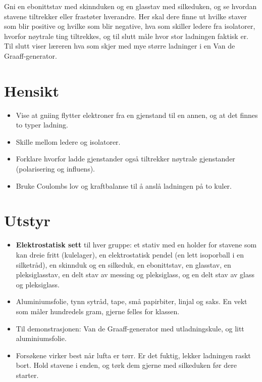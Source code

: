 \documentclass[11pt]{article}
\begin{document}

Gni en ebonittstav med skinnduken og en glasstav med silkeduken, og se hvordan stavene tiltrekker eller frastøter hverandre. Her skal dere finne ut hvilke staver som blir positive og hvilke som blir negative, hva som skiller ledere fra isolatorer, hvorfor nøytrale ting tiltrekkes, og til slutt måle hvor stor ladningen faktisk er. Til slutt viser læreren hva som skjer med mye større ladninger i en Van de Graaff-generator.

\section*{Hensikt}

\begin{itemize}
\item Vise at gniing flytter elektroner fra en gjenstand til en annen, og at det finnes to typer ladning.
\item Skille mellom ledere og isolatorer.
\item Forklare hvorfor ladde gjenstander også tiltrekker nøytrale gjenstander (polarisering og influens).
\item Bruke Coulombs lov og kraftbalanse til å anslå ladningen på to kuler.
\end{itemize}

\section*{Utstyr}

\begin{itemize}
\item \textbf{Elektrostatisk sett} til hver gruppe: et stativ med en holder for stavene som kan dreie fritt (kulelager), en elektrostatisk pendel (en lett isoporball i en silketråd), en skinnduk og en silkeduk, en ebonittstav, en glasstav, en pleksiglasstav, en delt stav av messing og pleksiglass, og en delt stav av glass og pleksiglass.
\item Aluminiumsfolie, tynn sytråd, tape, små papirbiter, linjal og saks. En vekt som måler hundredels gram, gjerne felles for klassen.
\item Til demonstrasjonen: Van de Graaff-generator med utladningskule, og litt aluminiumsfolie.
\item Forsøkene virker best når lufta er tørr. Er det fuktig, lekker ladningen raskt bort. Hold stavene i enden, og tørk dem gjerne med silkeduken før dere starter.
\end{itemize}
\end{document}
